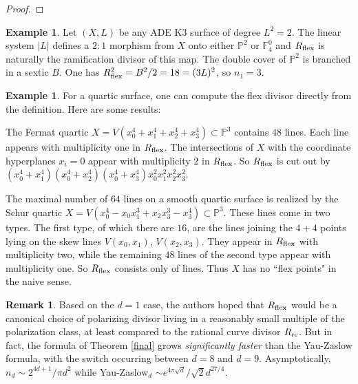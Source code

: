 \documentclass{amsart}
\theoremstyle{definition}
\newtheorem{example}[theorem]{Example}
\newtheorem{remark}[theorem]{Remark}
\begin{document}
\begin{proof}
\end{proof}

\begin{example}\label{deg2ex} Let $(X,L)$ be any ADE K3 surface of degree $L^2=2$.
The linear system $|L|$ defines a $2:1$ morphism from $X$ onto either
$\mathbb{P}^2$ or $\mathbb{F}_4^0$ and $R_{\rm flex}$ is naturally
the ramification divisor of this map.
The double cover of $\mathbb P^2$ is branched in a sextic $B$. One has
$R_{\rm flex}^2 = B^2/2 = 18=(3L)^2$, so $n_1=3$.
\end{example}

\begin{example}\label{deg4ex}
For a quartic surface, one can compute the flex divisor directly from
the definition. Here are some results:

The Fermat quartic
$X=V(x_0^4+x_1^4+x_2^4+x_3^4)\subset \mathbb{P}^3$
contains $48$ lines. Each line appears
with multiplicity one in $R_{\rm flex}$. The intersections of $X$ with
the coordinate hyperplanes $x_i=0$ appear with multiplicity $2$ in $R_{\rm flex}$. So
$R_{\rm flex}$ is cut out by $(x_0^4+x_1^4)(x_0^4+x_2^4)(x_0^4+x_3^4)x_0^2x_1^2x_2^2x_3^2.$

 The maximal number of $64$ lines on a smooth quartic surface
 is realized by the Schur quartic $X=V(x_0^4-x_0x_1^3+x_2x_3^3-x_3^4)\subset \mathbb{P}^3$.
These lines come in two types. The first type, of which there are
$16$,
are the lines joining the $4+4$ points lying on the skew lines $V(x_0,x_1)$,
$V(x_2,x_3)$. They
appear
in $R_{\rm flex}$ with multiplicity two, while the remaining $48$
lines of the second type appear with multiplicity one. So $R_{\rm flex}$ consists
only of lines. Thus $X$ has no ``flex points" in the naive sense.
 \end{example}

\begin{remark} Based on the $d=1$ case,
the authors hoped that $R_{\rm flex}$ would be a canonical choice
of polarizing divisor living in a reasonably small multiple of the polarization class,
at least compared to the rational curve divisor $R_{\rm rc}$. But in fact, the formula
of Theorem \ref{final} grows {\it significantly faster} than the
Yau-Zaslow formula, with the switch occurring between
$d=8$ and $d=9$. Asymptotically, $n_d\sim 2^{4d+1}/\pi d^2$
while Yau-Zaslow$_d$ $\sim e^{4\pi \sqrt{d}}/\sqrt{2}d^{27/4}$. \end{remark}

\renewcommand\MR[1]{}
 
\end{document}
